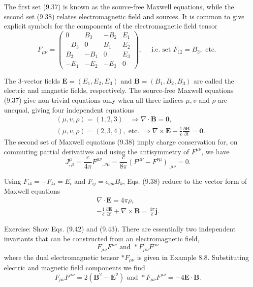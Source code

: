 \documentclass[hyperref,UTF8]{ctexbook}
\begin{document}
The first set (9.37) is known as the source-free Maxwell equations, while the second set (9.38) relates electromagnetic field and sources. It is common to give explicit symbols for the components of the electromagnetic field tensor
$$
F_{\mu \nu}=\left(\begin{array}{cccc}
0 & B_3 & -B_2 & E_1 \\
-B_3 & 0 & B_1 & E_2 \\
B_2 & -B_1 & 0 & E_3 \\
-E_1 & -E_2 & -E_3 & 0
\end{array}\right), \quad \text { i.e. set } F_{12}=B_3, \text { etc. }
$$

The 3-vector fields $\mathbf{E}=\left(E_1, E_2, E_3\right)$ and $\mathbf{B}=\left(B_1, B_2, B_3\right)$ are called the electric and magnetic fields, respectively. The source-free Maxwell equations (9.37) give non-trivial equations only when all three indices $\mu, v$ and $\rho$ are unequal, giving four independent equations
$$
\begin{aligned}
& (\mu, v, \rho)=(1,2,3) \quad \Longrightarrow \nabla \cdot \mathbf{B}=\mathbf{0}, \\
& (\mu, v, \rho)=(2,3,4), \text { etc. } \Longrightarrow \nabla \times \mathbf{E}+\frac{1}{c} \frac{\partial \mathbf{B}}{\partial t}=\mathbf{0} .
\end{aligned}
$$
The second set of Maxwell equations (9.38) imply charge conservation for, on commuting partial derivatives and using the antisymmetry of $F^{\mu \nu}$, we have
$$
J_{, \mu}^\mu=\frac{c}{4 \pi} F^{\mu \nu}{ }_{, \nu \mu}=\frac{c}{8 \pi}\left(F^{\mu \nu}-F^{\nu \mu}\right)_{, \mu \nu}=0 .
$$

Using $F_{i 4}=-F_{4 i}=E_i$ and $F_{i j}=\epsilon_{i j k} B_k$, Eqs. (9.38) reduce to the vector form of Maxwell equations
$$
\begin{array}{r}
\nabla \cdot \mathbf{E}=4 \pi \rho, \\
-\frac{1}{c} \frac{\partial \mathbf{E}}{\partial t}+\nabla \times \mathbf{B}=\frac{4 \pi}{c} \mathbf{j} .
\end{array}
$$

Exercise: Show Eqs. (9.42) and (9.43).
There are essentially two independent invariants that can be constructed from an electromagnetic field,
$$
F_{\mu \nu} F^{\mu \nu} \text { and } * F_{\mu \nu} F^{\mu \nu}
$$
where the dual electromagnetic tensor $* F_{\mu \nu}$ is given in Example 8.8. Substituting electric and magnetic field components we find
$$
F_{\mu \nu} F^{\mu \nu}=2\left(\mathbf{B}^2-\mathbf{E}^2\right) \text { and } * F_{\mu \nu} F^{\mu \nu}=-4 \mathbf{E} \cdot \mathbf{B} .
$$
\end{document}
